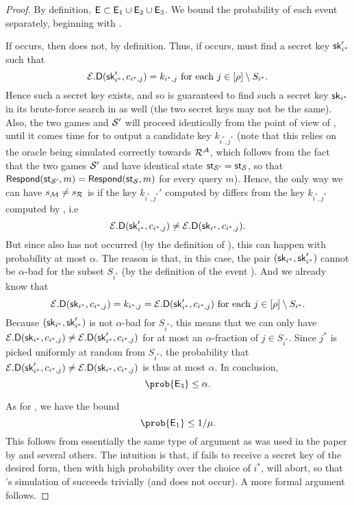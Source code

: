 \begin{proof}
  By definition, \(\mathsf{E} \subset \mathsf{E}_{1} \cup \mathsf{E}_{2} \cup \mathsf{E}_{3}\).
  We bound the probability of each event separately, beginning with .

  If  occurs, then  does not, by definition.
  Thus, if  occurs, \redM must find a secret key \(\mathsf{sk}_{i^{*}}'\) such that
  \[
  \mathcal{E}.\mathsf{D}(\mathsf{sk}_{i^{*}}',c_{i^{*},j}) = k_{i^{*},j} \text{ for each } j \in [\rho] \setminus S_{i^{*}}.
  \]
  Hence such a secret key exists, and so \advA is guaranteed to find such a secret key \(\mathsf{sk}_{i^{*}}\)
  in its brute-force search in \Simple as well (the two secret keys may not be the same).
  Also, the two games \Simple and \(\mathcal{S}'\) will proceed identically from the point of view of \redR,
  until it comes time for \advA to output a candidate key \(k_{i^{*},j^{*}}\)
  (note that this relies on the oracle \oracle being simulated correctly towards \(\redR^{\advA}\),
  which follows from the fact that the two games \(\mathcal{S}'\) and \Simple
  have identical state \(\mathsf{st}_{\mathcal{S}'} = \mathsf{st}_{\mathcal{S}}\),
  so that \(\mathsf{Respond}(\mathsf{st}_{\mathcal{S}'},m) = \mathsf{Respond}(\mathsf{st}_{\mathcal{S}},m)\) for every query \(m\)).
  Hence, the only way we can have \(s_{\redM} \ne s_{\redR}\)
  is if the key \(k_{i^{*},j^{*}}'\) computed by \redM differs from the key \(k_{i^{*},j^{*}}\) computed by \advA,
  i.e
  \[
    \mathcal{E}.\mathsf{D}(\mathsf{sk}_{i^{*}}',c_{i^{*},j}) \ne \mathcal{E}.\mathsf{D}(\mathsf{sk}_{i^{*}},c_{i^{*},j}).
  \]
  But since  also has not occurred (by the definition of ),
  this can happen with probability at most \(\alpha\).
  The reason is that, in this case, the pair \((\mathsf{sk}_{i^{*}},\mathsf{sk}_{i^{*}}')\) cannot be
  \(\alpha\)-bad for the subset \(S_{i^{*}}\)
  (by the definition of the event ).
  And we already know that
  \[
  \mathcal{E}.\mathsf{D}(\mathsf{sk}_{i^{*}},c_{i^{*},j}) = k_{i^{*},j} = \mathcal{E}.\mathsf{D}(\mathsf{sk}_{i^{*}}',c_{i^{*},j}) \text{ for each } j \in [\rho] \setminus S_{i^{*}}.
  \]
  Because \((\mathsf{sk}_{i^{*}}, \mathsf{sk}_{i^{*}}')\) is not \(\alpha\)-bad for \(S_{i^{*}}\),
  this means that we can only have
  \(\mathcal{E}.\mathsf{D}(\mathsf{sk}_{i^{*}},c_{i^{*},j}) \ne \mathcal{E}.\mathsf{D}(\mathsf{sk}_{i^{*}}',c_{i^{*},j})\)
  for at most an \(\alpha\)-fraction of \(j \in S_{i^{*}}\).
  Since \(j^{*}\) is picked uniformly at random from \(S_{i^{*}}\), the probability that
  \(\mathcal{E}.\mathsf{D}(\mathsf{sk}_{i^{*}}',c_{i^{*},j}) \ne \mathcal{E}.\mathsf{D}(\mathsf{sk}_{i^{*}},c_{i^{*},j})\)
  is thus at most \(\alpha\).
  In conclusion,
  \[
    \prob{\eventi{3}} \le \alpha.
  \]

  As for , we have the bound
  \[
    \prob{\eventi{1}} \le 1/\mu.
  \]
  This follows from essentially the same type of argument as was used in the paper by \cite{EC:BJLS16} and several others.
  The intuition is that, if \redM fails to receive a secret key of the desired form,
  then with high probability over the choice of \(i^{*}\), \advA{} will abort,
  so that \redM's simulation of \advA succeeds trivially (and  does not occur).
  A more formal argument follows.


\end{proof}
